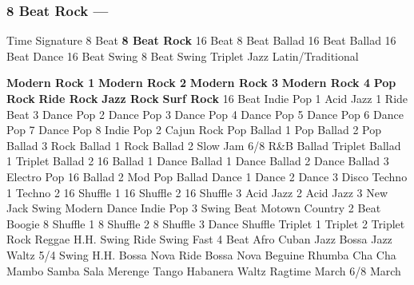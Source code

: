 \subsubsection[8 Beat Rock]{8 Beat Rock --- \UiKey{\II}\UiKey{\MET}}
Time Signature
8 Beat
\textbf{8 Beat Rock}
16 Beat
8 Beat Ballad
16 Beat Ballad
16 Beat Dance
16 Beat Swing
8 Beat Swing
Triplet
Jazz
Latin/Traditional





























\textbf{Modern Rock 1}
\textbf{Modern Rock 2}
\textbf{Modern Rock 3}
\textbf{Modern Rock 4}
\textbf{Pop Rock}
\textbf{Ride Rock}
\textbf{Jazz Rock}
\textbf{Surf Rock}
16 Beat
Indie Pop 1
Acid Jazz 1
Ride Beat 3
Dance Pop 2
Dance Pop 3
Dance Pop 4
Dance Pop 5
Dance Pop 6
Dance Pop 7
Dance Pop 8
Indie Pop 2
Cajun Rock
Pop Ballad 1
Pop Ballad 2
Pop Ballad 3
Rock Ballad 1
Rock Ballad 2
Slow Jam
6/8 R\&B Ballad
Triplet Ballad 1
Triplet Ballad 2
16 Ballad 1
Dance Ballad 1
Dance Ballad 2
Dance Ballad 3
Electro Pop
16 Ballad 2
Mod Pop Ballad
Dance 1
Dance 2
Dance 3
Disco
Techno 1
Techno 2
16 Shuffle 1
16 Shuffle 2
16 Shuffle 3
Acid Jazz 2
Acid Jazz 3
New Jack Swing
Modern Dance
Indie Pop 3
Swing Beat
Motown
Country 2 Beat
Boogie
8 Shuffle 1
8 Shuffle 2
8 Shuffle 3
Dance Shuffle
Triplet 1
Triplet 2
Triplet Rock
Reggae
H.H. Swing
Ride Swing
Fast 4 Beat
Afro Cuban
Jazz Bossa
Jazz Waltz
5/4 Swing
H.H. Bossa Nova
Ride Bossa Nova
Beguine
Rhumba
Cha Cha
Mambo
Samba
Sala
Merenge
Tango
Habanera
Waltz
Ragtime
March
6/8 March
